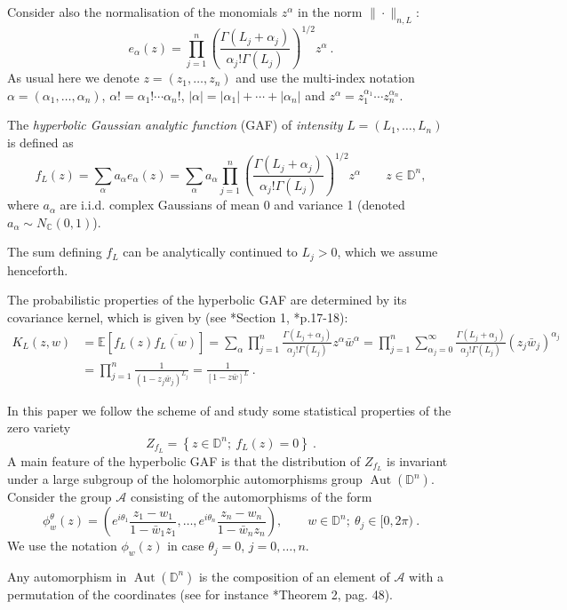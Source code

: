 \documentclass[12pt,twoside,final,amsfonts]{amsart}
\theoremstyle{plain}
\theoremstyle{definition}
\theoremstyle{definition}
\begin{document}
Consider also the normalisation of the monomials $z^\alpha$ in the norm $\|\cdot\|_{n,L}$:
\[
 e_{\alpha}(z)=\prod_{j=1}^n \left(\frac{\Gamma(L_j+\alpha_j)}{\alpha_j!\Gamma(L_j)}\right)^{1/2} z^\alpha\ .
\]
As usual here we denote $z=(z_1,\dots,z_n)$ and use the multi-index notation $\alpha=(\alpha_1,\dots,\alpha_n)$, $\alpha !=\alpha_1!\cdots \alpha_n!$, $|\alpha|=|\alpha_1|+\cdots +|\alpha_n|$ and $z^\alpha=z_1^{\alpha_1}\cdots z_n^{\alpha_n}$.

The \emph{hyperbolic Gaussian analytic function} (GAF) of \emph{intensity} $L=(L_1,\dots, L_n)$ is defined as
\[
 f_L(z)=\sum_\alpha a_\alpha e_{\alpha}(z)=\sum_\alpha a_\alpha  \prod_{j=1}^n \left(\frac{\Gamma(L_j+\alpha_j)}{\alpha_j!\Gamma(L_j)}\right)^{1/2} z^\alpha \qquad z\in{\mathbb{D}}^n,
\]
where $a_\alpha $ are i.i.d. complex Gaussians of mean 0 and variance 1 (denoted $a_\alpha \sim N_{\mathbb{C}}(0,1)$).

The sum defining $f_L$ can be analytically continued to $L_j>0$, which we assume henceforth.

The probabilistic properties of the hyperbolic GAF are determined by its covariance kernel, which is given by (see \cite{ST1}*{Section 1}, \cite{Stoll}*{p.17-18}):
\begin{align*}
 K_L(z,w)&={\mathbb{E}}[f_L(z)\overline{f_L(w)}]= \sum_\alpha  \prod_{j=1}^n \frac{\Gamma(L_j+\alpha_j)}{\alpha_j!\Gamma(L_j)} z^\alpha \bar w^\alpha=
 \prod_{j=1}^n \sum_{\alpha_j=0}^\infty   \frac{\Gamma(L_j+\alpha_j)}{\alpha_j! \Gamma(L_j)} (z_j\bar w_j)^{\alpha_j} \\
 &=
 \prod_{j=1}^n \frac 1{(1-z_j \bar w_j)^{L_j}}=
 \frac 1{[1-z \bar w]^{L}}\ .
\end{align*}

In this paper we follow the scheme of \cite{BMP} and study some statistical properties of the zero variety 
\[
 Z_{f_L}=\left\{z\in {\mathbb{D}}^n;\ f_L(z)=0\right\}\ .
\]
A main feature of the hyperbolic GAF is that the distribution of $Z_{f_L}$ is invariant under a large subgroup of the holomorphic automorphisms group ${\operatorname{Aut}}({\mathbb{D}}^n)$. 
Consider the group $\mathcal A$ consisting of the automorphisms of the form
\[
 \phi_w^\theta(z)=\left(e^{i\theta_1} \frac{z_1-w_1}{1-\bar w_1 z_1}, \dots, e^{i\theta_n} \frac{z_n-w_n}{1-\bar w_n z_n}\right),\qquad w\in{\mathbb{D}}^n; \ \theta_j\in [0,2\pi)\ .
\]
We use the notation $\phi_w(z)$ in case $\theta_j=0$, $j=0,\dots,n$.

Any automorphism in ${\operatorname{Aut}}({\mathbb{D}}^n)$ is the composition of an element of $\mathcal A$ with a permutation of the coordinates (see for instance \cite{Sha}*{Theorem 2, pag. 48}).
\end{document}
